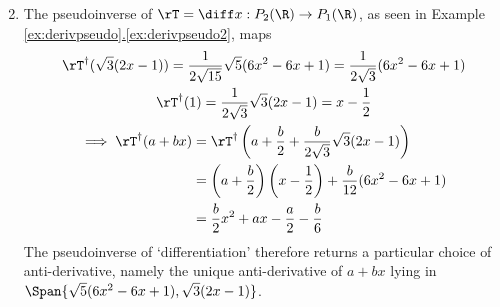 \begin{examples}{}{}
\begin{enumerate}\setcounter{enumi}{1}	
	\item %
The pseudoinverse of $\rT=\diff x:P_2(\R)\to P_1(\R)$, as seen in Example \hyperref[ex:derivpseudo2]{\ref*{ex:derivpseudo}.\ref*{ex:derivpseudo2}}, maps
\begin{gather*}
\rT^\dag(\sqrt 3(2x-1))=\frac 1{2\sqrt{15}}\sqrt 5(6x^2-6x+1) =\frac 1{2\sqrt 3}(6x^2-6x+1)\\
\rT^\dag(1)=\frac 1{2\sqrt 3}\sqrt 3(2x-1)=x-\frac 12\\
\begin{aligned}
\implies \rT^\dag(a+bx)&=\rT^\dag\left(a+\frac b2+\frac b{2\sqrt 3}\sqrt 3(2x-1)\right)\\
&=\left(a+\frac b2\right)\left(x-\frac 12\right)+\frac b{12}(6x^2-6x+1)\\
&=\frac b2x^2+ax-\frac a2-\frac b6
\end{aligned}
\end{gather*}
The pseudoinverse of `differentiation' therefore returns a particular choice of anti-derivative, namely the unique anti-derivative of $a+bx$ lying in $\Span\{\sqrt 5(6x^2-6x+1),\sqrt 3(2x-1)\}$.
\end{enumerate}
	
\end{examples}

